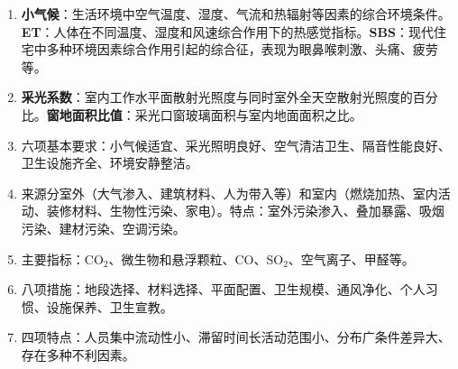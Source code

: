 \begin{enumerate}[leftmargin=*, itemsep=5pt]
    \item \textbf{小气候}：生活环境中空气温度、湿度、气流和热辐射等因素的综合环境条件。\textbf{ET}：人体在不同温度、湿度和风速综合作用下的热感觉指标。\textbf{SBS}：现代住宅中多种环境因素综合作用引起的综合征，表现为眼鼻喉刺激、头痛、疲劳等。

    \item \textbf{采光系数}：室内工作水平面散射光照度与同时室外全天空散射光照度的百分比。\textbf{窗地面积比值}：采光口窗玻璃面积与室内地面面积之比。

    \item 六项基本要求：小气候适宜、采光照明良好、空气清洁卫生、隔音性能良好、卫生设施齐全、环境安静整洁。

    \item 来源分室外（大气渗入、建筑材料、人为带入等）和室内（燃烧加热、室内活动、装修材料、生物性污染、家电）。特点：室外污染渗入、叠加暴露、吸烟污染、建材污染、空调污染。

    \item 主要指标：CO$_2$、微生物和悬浮颗粒、CO、SO$_2$、空气离子、甲醛等。

    \item 八项措施：地段选择、材料选择、平面配置、卫生规模、通风净化、个人习惯、设施保养、卫生宣教。

    \item 四项特点：人员集中流动性小、滞留时间长活动范围小、分布广条件差异大、存在多种不利因素。
\end{enumerate}

\newpage


\newpage